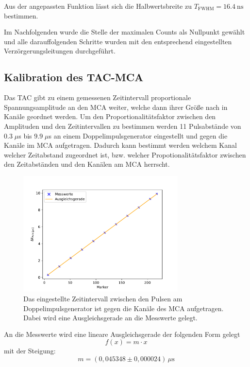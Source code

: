         Aus der angepassten Funktion lässt sich die Halbwertsbreite zu $T_{\text{FWHM}} = \SI{16,4}{\nano \second}$ bestimmen.

        Im Nachfolgenden wurde die Stelle der maximalen Counts als Nullpunkt gewählt und alle darauffolgenden Schritte wurden mit den entsprechend eingestellten Verzörgerungsleitungen durchgeführt.

    \subsection{Kalibration des TAC-MCA}
        Das TAC gibt zu einem gemessenen Zeitintervall proportionale Spannungsamplitude an den MCA weiter, welche dann ihrer Größe nach in Kanäle geordnet werden. Um den Proportionalitätsfaktor zwischen den Amplituden und den Zeitintervallen zu bestimmen werden 11 Pulsabstände von $0.3\;\mu$s bis $9.9\;\mu$s an einem Doppelimpulsgenerator eingestellt und gegen die Kanäle im MCA aufgetragen. Dadurch kann bestimmt werden welchem Kanal welcher Zeitabstand zugeordnet ist, bzw. welcher Propotionalitätsfaktor zwischen den Zeitabständen und den Kanälen am MCA herrscht.

        \begin{figure}[h]
            \centering
            \includegraphics[width = 0.75\textwidth]{plots/Marker_Faktor.pdf}
            \caption{Das eingestellte Zeitintervall zwischen den Pulsen am Doppelimpulsgenerator ist gegen die Kanäle des MCA aufgetragen. Dabei wird eine Ausgleichsgerade an die Messwerte gelegt.}
            \label{fig:Marker_Faktor}
        \end{figure}

        \FloatBarrier

        An die Messwerte wird eine lineare Ausgleichsgerade der folgenden Form gelegt
        \begin{equation*}
            f(x) = m \cdot x
        \end{equation*}
        mit der Steigung:
        \begin{equation*}
            m = (0,045348 \pm 0,000024) \, \mu\text{s}
        \end{equation*}
    
